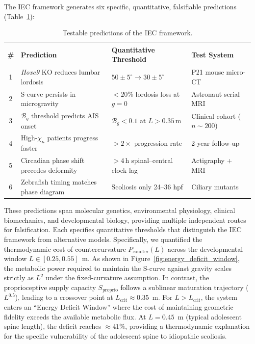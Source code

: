 \documentclass[11pt]{article}
\begin{document}
The IEC framework generates six specific, quantitative, falsifiable predictions (Table~\ref{tab:predictions}):

\begin{table}[h!]
\centering
\caption{Testable predictions of the IEC framework.}
\label{tab:predictions}
\small
\begin{tabular}{clll}
\toprule
\textbf{\#} & \textbf{Prediction} & \textbf{Quantitative Threshold} & \textbf{Test System} \\
\midrule
1 & \textit{Hoxc9} KO reduces lumbar lordosis & $50 \pm 5^\circ \to 30 \pm 5^\circ$ & P21 mouse micro-CT \\
2 & S-curve persists in microgravity & $<20\%$ lordosis loss at $g = 0$ & Astronaut serial MRI \\
3 & $\mathcal{B}_g$ threshold predicts AIS onset & $\mathcal{B}_g < 0.1$ at $L > 0.35$\,m & Clinical cohort ($n \sim 200$) \\
4 & High-$\chi_\kappa$ patients progress faster & $>2\times$ progression rate & 2-year follow-up \\
5 & Circadian phase shift precedes deformity & $>4$\,h spinal--central clock lag & Actigraphy + MRI \\
6 & Zebrafish timing matches phase diagram & Scoliosis only 24--36 hpf & Ciliary mutants \\
\bottomrule
\end{tabular}
\end{table}

These predictions span molecular genetics, environmental physiology, clinical biomechanics, and developmental biology, providing multiple independent routes for falsification. Each specifies quantitative thresholds that distinguish the IEC framework from alternative models.
Specifically, we quantified the thermodynamic cost of countercurvature $P_{\mathrm{counter}}(L)$ across the developmental window $L \in [0.25, 0.55]$~m. As shown in Figure~\ref{fig:energy_deficit_window}, the metabolic power required to maintain the S-curve against gravity scales strictly as $L^2$ under the fixed-curvature assumption. In contrast, the proprioceptive supply capacity $S_{\mathrm{proprio}}$ follows a sublinear maturation trajectory ($L^{0.5}$), leading to a crossover point at $L_{\mathrm{crit}} \approx 0.35$~m. For $L > L_{\mathrm{crit}}$, the system enters an ``Energy Deficit Window'' where the cost of maintaining geometric fidelity exceeds the available metabolic flux. At $L=0.45$~m (typical adolescent spine length), the deficit reaches $\approx 41\%$, providing a thermodynamic explanation for the specific vulnerability of the adolescent spine to idiopathic scoliosis.
\end{document}
